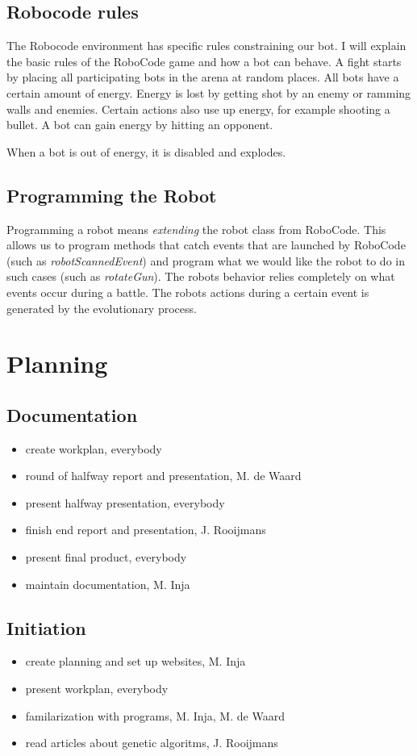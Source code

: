 \documentclass[a4paper,10pt]{article}
\begin{document}
\subsection{Robocode rules}
The Robocode environment has specific rules constraining our bot. I will explain the basic rules of the RoboCode game and how a bot can behave.
A fight starts by placing all participating bots in the arena at random places. All bots have a certain amount of energy. Energy is lost by getting shot by an enemy or ramming walls and enemies. Certain actions also use up energy, for example shooting a bullet.
A bot can gain energy by hitting an opponent.

When a bot is out of energy, it is disabled and explodes.

\subsection{Programming the Robot}
Programming a robot means \textit{extending} the robot class from RoboCode. This allows us to program methods that catch events that are launched by RoboCode (such as \textit{robotScannedEvent}) and program what we would like the robot to do in such cases (such as \textit{rotateGun}). The robots behavior relies completely on what events occur during a battle. The robots actions during a certain event is generated by the evolutionary process. 


   
    
\newpage
\section{Planning}
\subsection{Documentation}
\begin{itemize}
 \item create workplan, everybody
 \item round of halfway report and presentation, M. de Waard
 \item present halfway presentation, everybody
 \item finish end report and presentation, J. Rooijmans
 \item present final product, everybody
 \item maintain documentation, M. Inja
\end{itemize}

\subsection{Initiation}
\begin{itemize}
\item create planning and set up websites, M. Inja
\item present workplan, everybody
\item familarization with programs, M. Inja, M. de Waard
\item read articles about genetic algoritms, J. Rooijmans
\end{itemize}
\end{document}
